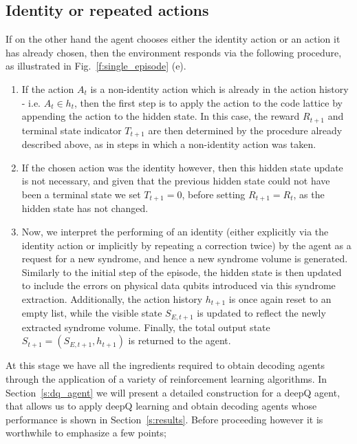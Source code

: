 \documentclass[twocolumn,preprintnumbers,amsmath,amssymb,notitlepage,nofootinbib,longbibliography,superscriptaddress,aps,pra,10pt]{revtex4-1}
\begin{document}
	\subsection{Identity or repeated actions}

		If on the other hand the agent chooses either the identity action or an action it has already chosen, then the environment responds via the following procedure, as illustrated in Fig.~\ref{f:single_episode} (e).

		\begin{enumerate}
			\item If the action $A_t$ is a non-identity action which is already in the action history - i.e. $A_t \in h_t$, then the first step is to apply the action to the code lattice by appending the action to the hidden state. In this case, the reward $R_{t+1}$ and terminal state indicator $T_{t+1}$ are then determined by the procedure already described above, as in steps in which a non-identity action was taken.
			\item If the chosen action was the identity however, then this hidden state update is not necessary, and given that the previous hidden state could not have been a terminal state we set $T_{t+1} = 0$, before setting $R_{t+1} = R_t$, as the hidden state has not changed.
			\item Now, we interpret the performing of an identity (either explicitly via the identity action or implicitly by repeating a correction twice) by the agent as a request for a new syndrome, and hence a new syndrome volume is generated.
			Similarly to the initial step of the episode, the hidden state is then updated to include the errors on physical data qubits introduced via this syndrome extraction.
			Additionally, the action history $h_{t+1}$ is once again reset to an empty list, while the visible state $S_{E,t+1}$ is updated to reflect the newly extracted syndrome volume.
			Finally, the total output state $S_{t+1} = (S_{E,t+1},h_{t+1})$ is returned to the agent.
		\end{enumerate}
	

	At this stage we have all the ingredients required to obtain decoding agents through the application of a variety of reinforcement learning algorithms.
	In Section~\ref{s:dq_agent} we will present a detailed construction for a deepQ agent, that allows us to apply deepQ learning and obtain decoding agents whose
	performance is shown in Section~\ref{s:results}.
	Before proceeding however it is worthwhile to emphasize a few points;
\end{document}
